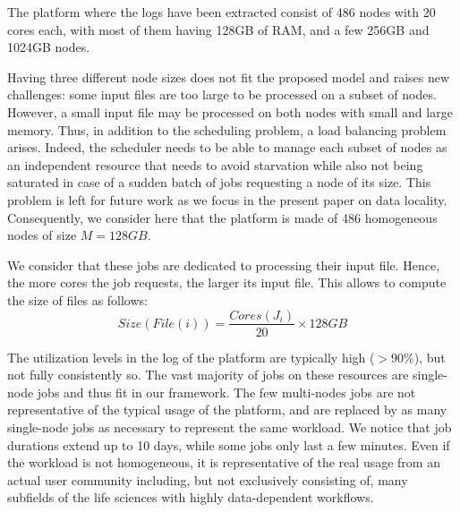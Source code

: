 \documentclass[conference,10pt]{IEEEtran}
\newcommand{\file}{\ensuremath{\mathit{File}}\xspace}
\newcommand{\size}{\ensuremath{\mathit{Size}}\xspace}
\newcommand{\memory}{\ensuremath{\mathit{M}}\xspace}
\newcommand{\core}{\mathit{Cores}\xspace}
\begin{document}
The platform where the logs have been extracted
consist of 486 nodes with 20 cores each, with most of them
having 128GB of RAM, and a few 256GB and 1024GB nodes.

Having three different node sizes does not fit the proposed model and
raises new challenges: some input files are too large to be processed
on a subset of nodes. However, a small input file may be processed on
both nodes with small and large memory.
Thus, in addition to the scheduling problem, a load balancing problem arises.
Indeed, the scheduler needs to be able to manage each subset of nodes as an independent 
resource that needs to avoid starvation while also not being saturated
in case of a sudden batch of jobs requesting a node of its size. This
problem is left for future work as we focus in the present paper on
data locality.
Consequently, we consider here that the platform is made of 486 homogeneous nodes of size 
$\memory = 128GB$.


We consider that these jobs are dedicated to processing their input
file. Hence, the more cores the job requests, 
the larger its input file. This allows to compute the size of files as follows:
$$\size(\file(i)) =\frac{\core(J_i)}{20} \times 128GB$$

The utilization levels in the log of the platform are typically high ($>90\%$), but
not fully consistently so. The vast majority of jobs on these
resources are single-node jobs and thus fit in our framework.
The few multi-nodes jobs are not representative of the typical usage
of the platform, and are replaced by as many single-node jobs as necessary to represent the same workload.
We notice that job
durations extend up to 10 days, while some jobs only last a few
minutes. Even if the workload is not homogeneous, it is representative
of the real usage from an actual user community including, but not exclusively consisting of, many subfields of the life sciences with highly data-dependent workflows.
\end{document}
